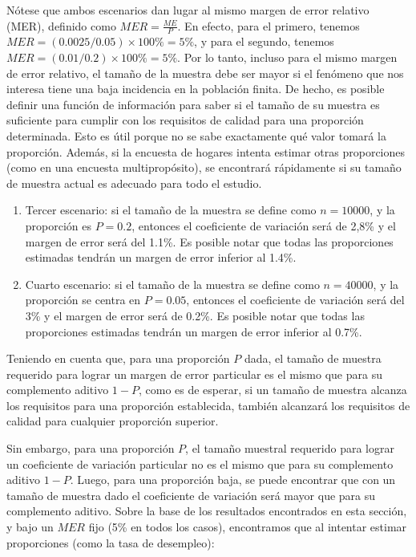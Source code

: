 \documentclass[
  12pt,
  spanish,
]{book}
\begin{document}
Nótese que ambos escenarios dan lugar al mismo margen de error relativo (MER), definido como \(MER=\frac{ME}{{P}}\). En efecto, para el primero, tenemos \(MER=(0.0025/0.05)\times 100\%=5\%\), y para el segundo, tenemos \(MER=(0.01/0.2)\times 100\%=5\%\). Por lo tanto, incluso para el mismo margen de error relativo, el tamaño de la muestra debe ser mayor si el fenómeno que nos interesa tiene una baja incidencia en la población finita. De hecho, es posible definir una función de información para saber si el tamaño de su muestra es suficiente para cumplir con los requisitos de calidad para una proporción determinada. Esto es útil porque no se sabe exactamente qué valor tomará la proporción. Además, si la encuesta de hogares intenta estimar otras proporciones (como en una encuesta multipropósito), se encontrará rápidamente si su tamaño de muestra actual es adecuado para todo el estudio.

\begin{enumerate}
\def\labelenumi{\arabic{enumi}.}
\setcounter{enumi}{2}
\item
  Tercer escenario: si el tamaño de la muestra se define como \(n = 10000\), y la proporción es \(P=0.2\), entonces el coeficiente de variación será de 2,8\% y el margen de error será del 1.1\%. Es posible notar que todas las proporciones estimadas tendrán un margen de error inferior al 1.4\%.
\item
  Cuarto escenario: si el tamaño de la muestra se define como \(n = 40000\), y la proporción se centra en \(P=0.05\), entonces el coeficiente de variación será del 3\% y el margen de error será de 0.2\%. Es posible notar que todas las proporciones estimadas tendrán un margen de error inferior al 0.7\%.
\end{enumerate}

Teniendo en cuenta que, para una proporción \(P\) dada, el tamaño de muestra requerido para lograr un margen de error particular es el mismo que para su complemento aditivo \(1-P\), como es de esperar, si un tamaño de muestra alcanza los requisitos para una proporción establecida, también alcanzará los requisitos de calidad para cualquier proporción superior.

Sin embargo, para una proporción \(P\), el tamaño muestral requerido para lograr un coeficiente de variación particular no es el mismo que para su complemento aditivo \(1-P\). Luego, para una proporción baja, se puede encontrar que con un tamaño de muestra dado el coeficiente de variación será mayor que para su complemento aditivo. Sobre la base de los resultados encontrados en esta sección, y bajo un \(MER\) fijo (5\% en todos los casos), encontramos que al intentar estimar proporciones (como la tasa de desempleo):
\end{document}
